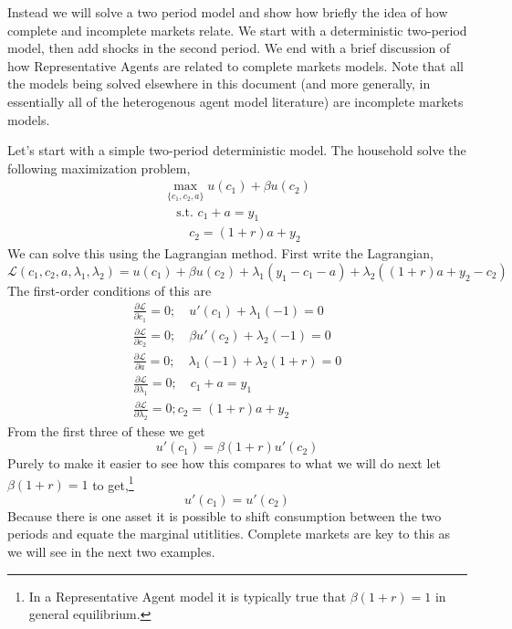 Instead we will solve a two period model and show how briefly the idea of how complete and incomplete markets relate. We start with a deterministic two-period model, then add shocks in the second period. We end with a brief discussion of how Representative Agents are related to complete markets models. Note that all the models being solved elsewhere in this document (and more generally, in essentially all of the heterogenous agent model literature) are incomplete markets models.

Let's start with a simple two-period deterministic model. The household solve the following maximization problem,
\begin{eqnarray*}
 \max_{\{c_1,c_2,a\}} u(c_1)+\beta u(c_2) \\
 \quad \text{s.t. } c_1+a=y_1 \\
 \quad \quad c_2=(1+r)a+y_2
\end{eqnarray*}
We can solve this using the Lagrangian method. First write the Lagrangian,
\begin{equation*}
 \mathcal{L}(c_1,c_2,a,\lambda_1,\lambda_2)= u(c_1)+\beta u(c_2) + \lambda_1(y_1-c_1-a)+\lambda_2((1+r)a+y_2-c_2)
\end{equation*}
The first-order conditions of this are
\begin{eqnarray*}
 \frac{\partial \mathcal{L}}{\partial c_1}=0; \quad u'(c_1)+\lambda_1(-1)=0 \\
 \frac{\partial \mathcal{L}}{\partial c_2}=0; \quad \beta u'(c_2)+\lambda_2(-1)=0 \\
 \frac{\partial \mathcal{L}}{\partial a}=0; \quad \lambda_1(-1)+\lambda_2 (1+r)=0 \\
 \frac{\partial \mathcal{L}}{\partial \lambda_1}=0; \quad c_1+a=y_1 \\
 \frac{\partial \mathcal{L}}{\partial \lambda_2}=0; c_2=(1+r)a+y_2
\end{eqnarray*}
From the first three of these we get
\begin{equation*}
 u'(c_1)=\beta (1+r) u'(c_2)
\end{equation*}
Purely to make it easier to see how this compares to what we will do next let $\beta (1+r)=1$ to get,\footnote{In a Representative Agent model it is typically true that $\beta (1+r)=1$ in general equilibrium.}
\begin{equation*}
 u'(c_1)=u'(c_2)
\end{equation*}
Because there is one asset it is possible to shift consumption between the two periods and equate the marginal utitlities. Complete markets are key to this as we will see in the next two examples.


